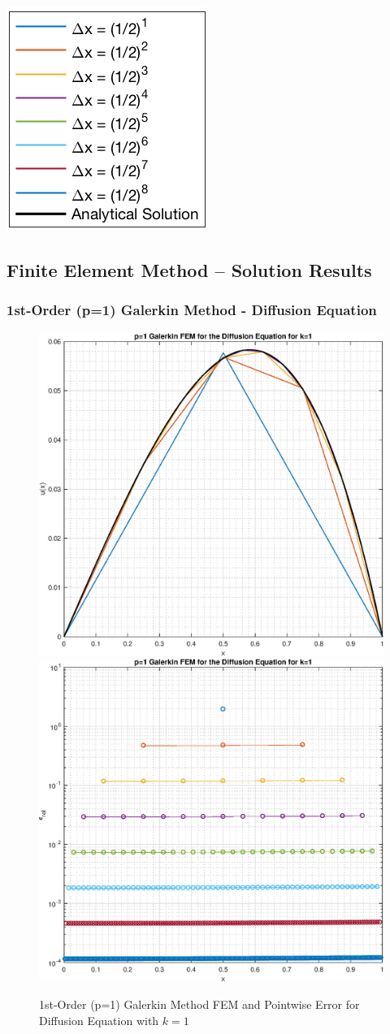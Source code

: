 \documentclass[10pt]{article}		%
\numberwithin{equation}{section}
\begin{document}
\begin{center}
	\includegraphics[height = 0.11\linewidth]{legend}
\end{center}

\newpage

\subsection{Finite Element Method -- Solution Results}

\subsubsection{1st-Order (p=1) Galerkin Method - Diffusion Equation}

\begin{figure}[H]
	\begin{center}
		\includegraphics[width = 0.31\linewidth]{solution_diffusion_p_1_k_1}
		\includegraphics[width = 0.31\linewidth]{pointwise_error_diffusion_p_1_k_1}
		\caption{1st-Order (p=1) Galerkin Method FEM and Pointwise Error for Diffusion Equation with $k = 1$}
	\end{center}
\end{figure}
\end{document}
